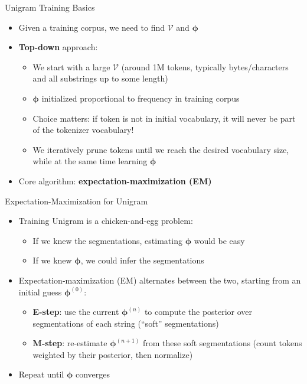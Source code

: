 \documentclass[11pt,compress,t,notes=noshow, xcolor=table]{beamer}
\newcommand{\vocab}{\mathcal{V}}
\newcommand{\probs}{\boldsymbol{\phi}}
\begin{document}
\begin{frame}{Unigram Training Basics}

\vfill

\begin{itemize}
\item Given a training corpus, we need to find $\vocab$ and $\probs$
\item \textbf{Top-down} approach: 
\begin{itemize}
\item We start with a large $\vocab$ (around 1M tokens, typically bytes/characters and all substrings up to some length)
\item $\probs$ initialized proportional to frequency in training corpus
\item Choice matters: if token is not in initial vocabulary, it will never be part of the tokenizer vocabulary!
\item We iteratively prune tokens until we reach the desired vocabulary size, while at the same time learning $\probs$
\end{itemize}
\item Core algorithm: \textbf{expectation-maximization (EM)}
\end{itemize}

\vfill

\end{frame}




\begin{frame}{Expectation-Maximization for Unigram}
 
\vfill
 
\begin{itemize}
\item Training Unigram is a chicken-and-egg problem:
  \begin{itemize}
  \item If we knew the segmentations, estimating $\probs$ would be easy
  \item If we knew $\probs$, we could infer the segmentations
  \end{itemize}
\item Expectation-maximization (EM) alternates between the two, starting from an initial guess $\probs^{(0)}$:
  \begin{itemize}
  \item \textbf{E-step}: use the current $\probs^{(n)}$ to compute the posterior over segmentations of each string (``soft'' segmentations)
  \item \textbf{M-step}: re-estimate $\probs^{(n+1)}$ from these soft segmentations (count tokens weighted by their posterior, then normalize)
  \end{itemize}
\item Repeat until $\probs$ converges
\end{itemize}
 
\vfill
 
\end{frame}
 
\end{document}
